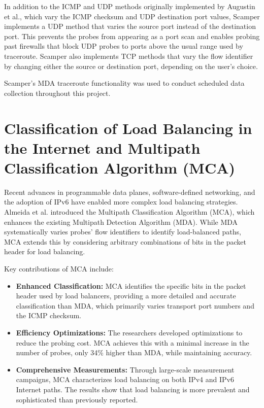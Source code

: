\documentclass[12pt]{cwru_thesis}
\begin{document}
In addition to the ICMP and UDP methods originally implemented by Augustin et al., which vary the ICMP checksum and UDP destination port values, Scamper implements a UDP method that varies the source port instead of the destination port. This prevents the probes from appearing as a port scan and enables probing past firewalls that block UDP probes to ports above the usual range used by traceroute. Scamper also implements TCP methods that vary the flow identifier by changing either the source or destination port, depending on the user’s choice.

Scamper's MDA traceroute functionality was used to conduct scheduled data collection throughout this project.


\section{Classification of Load Balancing in the Internet and Multipath Classification Algorithm (MCA)}

Recent advances in programmable data planes, software-defined networking, and the adoption of IPv6 have enabled more complex load balancing strategies. Almeida et al. introduced the Multipath Classification Algorithm (MCA), which enhances the existing Multipath Detection Algorithm (MDA). While MDA systematically varies probes' flow identifiers to identify load-balanced paths, MCA extends this by considering arbitrary combinations of bits in the packet header for load balancing.

Key contributions of MCA include:
\begin{itemize}
    \item \textbf{Enhanced Classification:} MCA identifies the specific bits in the packet header used by load balancers, providing a more detailed and accurate classification than MDA, which primarily varies transport port numbers and the ICMP checksum.
    \item \textbf{Efficiency Optimizations:} The researchers developed optimizations to reduce the probing cost. MCA achieves this with a minimal increase in the number of probes, only 34\% higher than MDA, while maintaining accuracy.
    \item \textbf{Comprehensive Measurements:} Through large-scale measurement campaigns, MCA characterizes load balancing on both IPv4 and IPv6 Internet paths. The results show that load balancing is more prevalent and sophisticated than previously reported.
\end{itemize}
\end{document}
